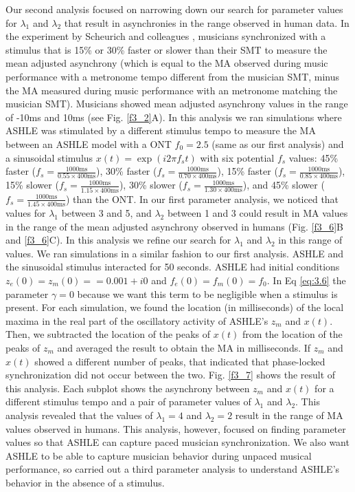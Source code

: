 \documentclass{report}
\begin{document}
Our second analysis focused on narrowing down our search for parameter values for $\lambda_1$ and $\lambda_2$ that result in asynchronies in the range observed in human data. In the experiment by Scheurich and colleagues \cite{scheurich2018tapping}, musicians synchronized with a stimulus that is 15\% or 30\% faster or slower than their SMT to measure the mean adjusted asynchrony (which is equal to the MA observed during music performance with a metronome tempo different from the musician SMT, minus the MA measured during music performance with an metronome matching the musician SMT). Musicians showed mean adjusted asynchrony values in the range of -10ms and 10ms (see Fig.{} \ref{f3_2}A). In this analysis we ran simulations where ASHLE was stimulated by a different stimulus tempo to measure the MA between an ASHLE model with a ONT $f_0 = 2.5$ (same as our first analysis) and a sinusoidal stimulus $x(t) = \exp(i2\pi f_s t)$ with six potential $f_s$ values: 45\% faster ($f_s = \frac{1000\text{ms}}{0.55 \times 400\text{ms}}$), 30\% faster ($f_s = \frac{1000\text{ms}}{0.70 \times 400\text{ms}}$), 15\% faster ($f_s = \frac{1000\text{ms}}{0.85 \times 400\text{ms}}$), 15\% slower ($f_s = \frac{1000\text{ms}}{1.15 \times 400\text{ms}}$), 30\% slower ($f_s = \frac{1000\text{ms}}{1.30 \times 400\text{ms}}$), and 45\% slower ($f_s = \frac{1000\text{ms}}{1.45 \times 400\text{ms}}$) than the ONT. In our first parameter analysis, we noticed that values for $\lambda_1$ between 3 and 5, and $\lambda_2$ between 1 and 3 could result in MA values in the range of the mean adjusted asynchrony observed in humans (Fig.{} \ref{f3_6}B and \ref{f3_6}C). In this analysis we refine our search for $\lambda_1$ and $\lambda_2$ in this range of values. We ran simulations in a similar fashion to our first analysis. ASHLE and the sinusoidal stimulus interacted for 50 seconds. ASHLE had initial conditions $z_e(0)=z_m(0)== 0.001 + i0$ and $f_e(0)=f_m(0)=f_0$. In Eq \eqref{eq:3.6} the parameter $\gamma=0$ because we want this term to be negligible when a stimulus is present. For each simulation, we found the location (in milliseconds) of the local maxima in the real part of the oscillatory activity of ASHLE's $z_m$ and $x(t)$. Then, we subtracted the location of the peaks of $x(t)$ from the location of the peaks of $z_m$ and averaged the result to obtain the MA in milliseconds. If $z_m$ and $x(t)$ showed a different number of peaks, that indicated that phase-locked synchronization did not occur between the two. Fig.{} \ref{f3_7} shows the result of this analysis. Each subplot shows the asynchrony between $z_m$ and $x(t)$ for a different stimulus tempo and a pair of parameter values of $\lambda_1$ and $\lambda_2$. This analysis revealed that the values of $\lambda_1 = 4$ and $\lambda_2 = 2$ result in the range of MA values observed in humans. This analysis, however, focused on finding parameter values so that ASHLE can capture paced musician synchronization. We also want ASHLE to be able to capture musician behavior during unpaced musical performance, so carried out a third parameter analysis to understand ASHLE's behavior in the absence of a stimulus.
\end{document}
